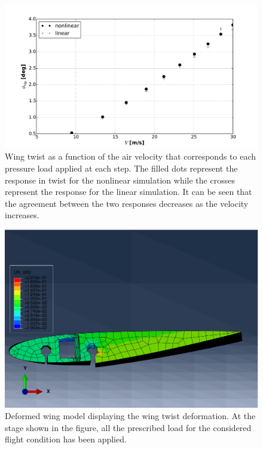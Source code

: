       \begin{figure}[!htpb]
        \centering
        \includegraphics[width=0.8 \textwidth]{figures/wing-model/twist_perV_s3_V30}
        \caption[Wing twist as a function of the air velocity]{Wing twist as a function of the air velocity that corresponds to each pressure load applied at each step. The filled dots represent the response in twist for the nonlinear simulation while the crosses represent the response for the linear simulation. It can be seen that the agreement between the two responses decreases as the velocity increases.}
        \label{fig:twist_perV_s3_V30}
      \end{figure}

      \begin{figure}[!htpb]
        \centering
        \includegraphics[width=0.8 \textwidth]{figures/wing-model/bucklingWing3}
        \caption[Deformed wing model displaying the wing twist deformation]{Deformed wing model displaying the wing twist deformation. At the stage shown in the figure, all the prescribed load for the considered flight condition has been applied.}
        \label{fig:bucklingWing3}
      \end{figure}

